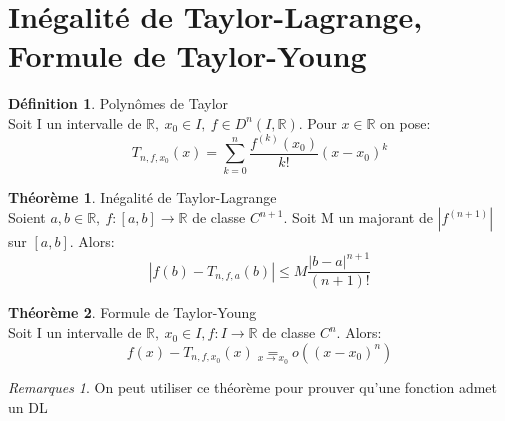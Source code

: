 \documentclass[fleqn]{article}
\theoremstyle{definition} \newtheorem*{defi}{D\'efinition}
\theoremstyle{definition} \newtheorem*{theo}{Th\'eor\`eme}
\theoremstyle{remark} \newtheorem*{rqs}{Remarques}
\theoremstyle{definition} \newtheorem*{prop}{Propri\'et\'e}
\begin{document}
\section{In\'egalit\'e de Taylor-Lagrange, Formule de Taylor-Young}
\begin{defi} Polyn\^omes de Taylor \\
	Soit I un intervalle de $\mathbb{R},\ x_0 \in I,\ f \in D^n(I, \mathbb{R})$. Pour $x \in \mathbb{R}$ on pose:
	\[T_{n,f,x_0}(x) = \sum_{k=0}^{n} \frac{f^{(k)}(x_0)}{k!}(x-x_0)^k\]
\end{defi}

\begin{theo} In\'egalit\'e de Taylor-Lagrange\\
	Soient $a,b \in \mathbb{R},\ f:[a,b] \rightarrow \mathbb{R}$ de classe $C^{n+1}$. Soit M un majorant de $|f^{(n+1)}|$ sur $[a,b]$. Alors:
	\[|f(b) - T_{n,f,a}(b)| \leq M\frac{|b-a|^{n+1}}{(n+1)!}\]
\end{theo}

\begin{theo} Formule de Taylor-Young\\
	Soit I un intervalle de $\mathbb{R},\ x_0 \in I, f:I\rightarrow \mathbb{R}$ de classe $C^n$. Alors:
	\[f(x) - T_{n,f,x_0}(x) \underset{x \rightarrow x_0}{=} o((x-x_0)^n)\]

	\begin{rqs}
		On peut utiliser ce th\'eor\`eme pour prouver qu'une fonction admet un DL
	\end{rqs}
\end{theo}
\end{document}
